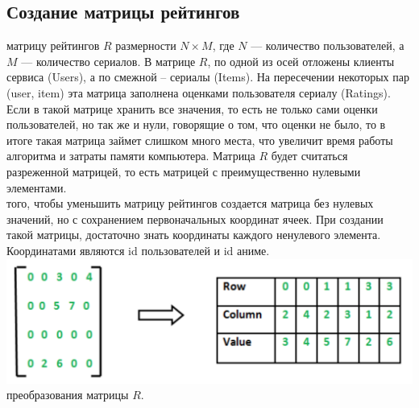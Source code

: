 \documentclass{article}
\newcommand\tab[1][1cm]{\hspace*{#1}}
\begin{document}
\subsection{Создание матрицы рейтингов}
 матрицу рейтингов $R$ размерности $N\times M$, где $N$ — количество пользователей, а $M$ — количество сериалов. В матрице $R$, по одной из осей отложены клиенты сервиса (Users), а по смежной – сериалы (Items). На пересечении некоторых пар (user, item) эта матрица заполнена оценками пользователя сериалу (Ratings). Если в такой матрице хранить все значения, то есть не только сами оценки пользователей, но так же и нули, говорящие о том, что оценки не было, то в итоге такая матрица займет слишком много места, что увеличит время работы алгоритма и затраты памяти компьютера. Матрица  $R$ будет считаться разреженной матрицей, то есть матрицей с преимущественно нулевыми элементами. \\
 того, чтобы уменьшить матрицу рейтингов создается матрица без нулевых значений, но с сохранением первоначальных координат ячеек. При создании такой матрицы, достаточно знать координаты каждого ненулевого элемента. Координатами являются id пользователей и id аниме.\\
\includegraphics[scale=0.8]{f11.png}\\
 преобразования матрицы  $R$.
\end{document}
